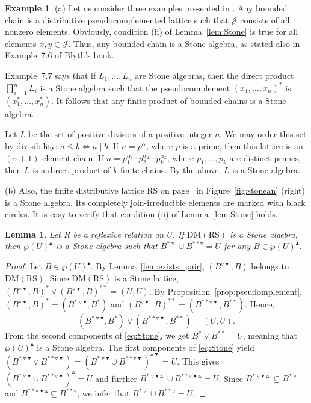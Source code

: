 \documentclass[11pt,a4paper]{amsart}
\newcommand{\UP}{\blacktriangle}
\newcommand{\DOWN}{\blacktriangledown}
\newcommand{\Up}{\vartriangle}
\newcommand{\Down}{\triangledown}
\theoremstyle{plain}
\newtheorem{lemma}[theorem]{Lemma}
\theoremstyle{definition}
\newtheorem{example}[theorem]{Example}
\theoremstyle{remark}
\numberwithin{equation}{section}
\begin{document}
\begin{example}
(a) Let us consider three examples presented in \cite{Blyth2005}. 
Any bounded chain is a distributive pseudocomplemented lattice
such that $\mathcal{J}$ consists of all nonzero elements.
Obviously,  condition (ii) of Lemma~\ref{lem:Stone} is true for all elements $x,y \in \mathcal{J}$.
Thus, any bounded chain is a Stone algebra, as stated also in
Example~{7.6} of Blyth's book.

Example~{7.7} says that if $L_1,\dots,L_n$ are Stone algebras, 
then the direct product $\prod_{i=1}^n L_i$ is a Stone algebra 
such that the pseudocomplement $(x_1,\dots,x_n)^*$ is 
$(x_1^*, \ldots, x_n^*)$. It follows that
any finite product of bounded chains is a Stone algebra.

Let $L$ be the set of positive divisors of a positive integer 
$n$. We may order this set by divisibility: $a \le b \iff a \mid b$.
If $n = p^{\alpha}$,  where $p$ is a prime, then this lattice is an 
$(\alpha + 1)$-element chain.  
If $n = p_1^{\alpha_1} \cdot p_2^{\alpha_2} \cdots p_k^{\alpha_k}$, 
where $p_1, \ldots, p_k$ are distinct primes, then $L$
is a direct product of $k$ finite chains. By the above,
$L$ is a Stone algebra.

 
\medskip%
(b) Also, the finite distributive lattice $\mathrm{RS}$ on page~\pageref{fig:stonean} in Figure~\ref{fig:stonean} (right) 
 is a Stone algebra. Its completely join-irreducible elements 
are marked with black circles. It is easy to verify that condition (ii) of Lemma~\ref{lem:Stone} holds.
\end{example}


\begin{lemma} \label{lem:Stone_backwards}
Let $R$ be a reflexive relation on $U$. If $\mathrm{DM(RS)}$ is a Stone algebra, then $\wp(U)^\UP$ is a Stone algebra
such that $B^{* \Down}\cup B^{**\Down}=U$ for any $B\in\wp(U)^\UP$.
\end{lemma}

\begin{proof}
Let $B\in\wp(U)^\UP$. By Lemma~\ref{lem:exists_pair},
$(B^{\Down\DOWN},B)$ belongs to $\mathrm{DM(RS)}$. Since
$\mathrm{DM(RS)}$ is a Stone lattice,  
$(B^{\Down\DOWN},B)^*\vee (B^{\Down\DOWN},B)^{**}=(U,U)$.
By Proposition~\ref{prop:pseudomplement},
$(B^{\Down\DOWN},B)^* = (B^{*\Down\DOWN},B^*)$ and
$(B^{\Down\DOWN},B)^{**} = (B^{** \Down\DOWN},B^{**})$. Hence,
\begin{equation} \label{eq:Stone}
(B^{*\Down\DOWN},B^*)\vee (B^{** \Down\DOWN},B^{**})=(U,U).
\end{equation}
From the second components of \eqref{eq:Stone}, 
we get $B^*\vee B^{**} =U$, meaning that
$\wp(U)^\UP$ is a Stone algebra. 
The first components of \eqref{eq:Stone}
yield 
$(B^{*\Down \DOWN} \vee B^{**\Down\DOWN}) = 
(B^{*\Down \DOWN}\cup B^{**\Down\DOWN})^{\Up\DOWN} = U$.
This gives $(B^{*\Down \DOWN}\cup B^{**\Down\DOWN})^\Up=U$ and
further $B^{*\Down \DOWN \Up}\cup B^{**\Down\DOWN\Up} = U$.
Since $B^{*\Down\DOWN\Up} \subseteq B^{*\Down}$ and
$B^{**\Down \DOWN\Up}\subseteq B^{**\Down}$, we infer that
$B^{*\Down}\cup B^{**\Down}=U$. 
\end{proof}
\end{document}
